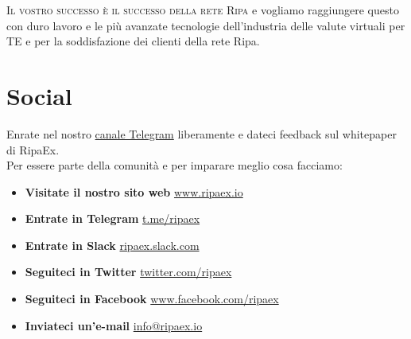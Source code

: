 \documentclass[11pt,fleqn]{book} %
\begin{document}
\textsc{Il vostro successo è il successo della rete Ripa} e vogliamo raggiungere questo con duro lavoro e le più 
avanzate tecnologie dell'industria delle valute virtuali per \textsc{TE} e per la soddisfazione dei clienti della
rete Ripa.

\newpage
\section{Social}
\label{sec:social}
Enrate nel nostro \href{https://t.me/ripaex}{canale Telegram} liberamente e dateci feedback sul whitepaper di RipaEx.\\

Per essere parte della comunità e per imparare meglio cosa facciamo:
\begin{itemize}
	\item \textbf{Visitate il nostro sito web} \href{https://www.ripaex.io}{\faHome \hspace{0.2cm} www.ripaex.io} 
	\item \textbf{Entrate in Telegram} \href{https://t.me/ripaex}{\faSend \hspace{0.2cm} t.me/ripaex}
	\item \textbf{Entrate in Slack} \href{https://join.slack.com/t/ripaex/shared_invite/enQtMzM4NzUwNjU4OTQ0LTY3MDJmMTdhYTNlZjJlNGUxNzM1YjUwYjgyYjZlMDJmOTg3NTIzNThmNTYyMGQ3ODBkOTRmYzk3Y2Y4MzBkOTY}{\faSlack \hspace{0.2cm} ripaex.slack.com}
	\item \textbf{Seguiteci in Twitter} \href{https://twitter.com/ripaex}{\faTwitter \hspace{0.2cm} twitter.com/ripaex}
	\item \textbf{Seguiteci in Facebook} \href{https://www.facebook.com/ripaex}{\faFacebook \hspace{0.2cm} www.facebook.com/ripaex}
	\item \textbf{Inviateci un'e-mail} \href{mailto:info@ripaex.io}{\faInternetExplorer \hspace{0.2cm} info@ripaex.io}
\end{itemize}

\end{document}

